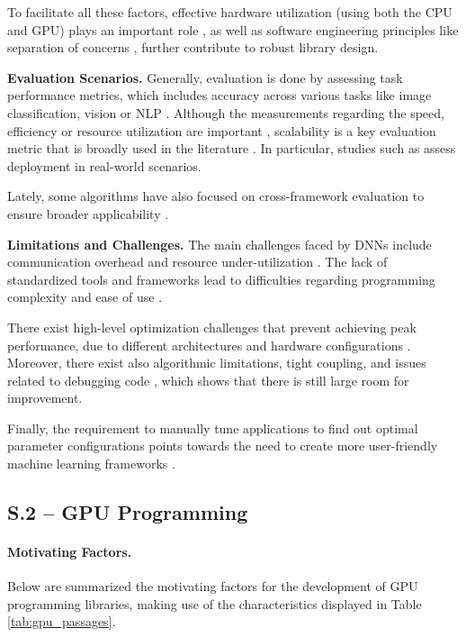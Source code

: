 To facilitate all these factors, effective hardware utilization (using both the CPU and GPU) plays
an important role , as well as software engineering principles like separation of
concerns , further contribute to robust library design.

\textbf{Evaluation Scenarios.}
Generally, evaluation is done by assessing task performance metrics, which includes accuracy
across various tasks like image classification, vision or NLP .
Although the measurements regarding the speed, efficiency or resource utilization are important
, scalability is a key evaluation metric that is broadly used in the
literature . In particular, studies such as  assess
deployment in real-world scenarios.

Lately, some algorithms have also focused on cross-framework evaluation to ensure broader
applicability .

\textbf{Limitations and Challenges.}
The main challenges faced by DNNs include communication overhead and resource under-utilization
. The lack of standardized tools and frameworks lead
to difficulties regarding programming complexity and ease of use .

There exist high-level optimization challenges that prevent achieving peak performance, due to
different architectures and hardware configurations . Moreover, there exist
also algorithmic limitations, tight coupling, and issues related to debugging code
, which shows that there is still large room for improvement.

Finally, the requirement to manually tune applications to find out optimal parameter configurations
points towards the need to create more user-friendly machine learning frameworks .

\subsection{S.2 -- GPU Programming}
\label{sec:gpu-studies}
\paragraph{Motivating Factors.}
Below are summarized the motivating factors for the development of GPU programming libraries,
making use of the characteristics displayed in Table \ref{tab:gpu_passages}.

